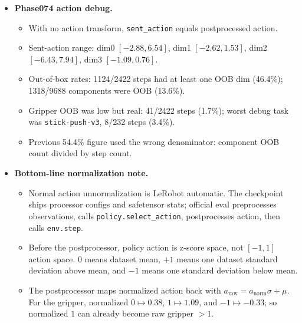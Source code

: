 \documentclass{article}
\begin{document}
\begin{itemize}
  \begin{itemize}
    \item Evidence indicates the dataset stores raw expert XYZ commands before Meta-World internal XYZ clipping.
    \item This is a strong inference, not an author-confirmed fact: no official dataset generation script or maintainer answer was found.
    \item Same ambiguity is publicly raised in the HF dataset discussion and LeRobot issue tracker.\footnote{\url{https://huggingface.co/datasets/lerobot/metaworld_mt50/discussions/5}}\footnote{\url{https://github.com/huggingface/lerobot/issues/2617}}
  \end{itemize}
  \item \textbf{Phase074 action debug.}
  \begin{itemize}
    \item With no action transform, \texttt{sent\_action} equals postprocessed action.
    \item Sent-action range: dim0 \([-2.88,6.54]\), dim1 \([-2.62,1.53]\), dim2 \([-6.43,7.94]\), dim3 \([-1.09,0.76]\).
    \item Out-of-box rates: 1124/2422 steps had at least one OOB dim (46.4\%); 1318/9688 components were OOB (13.6\%).
    \item Gripper OOB was low but real: 41/2422 steps (1.7\%); worst debug task was \texttt{stick-push-v3}, 8/232 steps (3.4\%).
    \item Previous 54.4\% figure used the wrong denominator: component OOB count divided by step count.
  \end{itemize}
  \item \textbf{Bottom-line normalization note.}
  \begin{itemize}
    \item Normal action unnormalization is LeRobot automatic.  The checkpoint ships processor configs and safetensor stats; official eval preprocesses observations, calls \texttt{policy.select\_action}, postprocesses action, then calls \texttt{env.step}.
    \item Before the postprocessor, policy action is z-score space, not \([-1,1]\) action space.  \(0\) means dataset mean, \(+1\) means one dataset standard deviation above mean, and \(-1\) means one standard deviation below mean.
    \item The postprocessor maps normalized action back with \(a_{\mathrm{raw}} = a_{\mathrm{norm}}\sigma+\mu\).  For the gripper, normalized \(0 \mapsto 0.38\), \(1 \mapsto 1.09\), and \(-1 \mapsto -0.33\); so normalized \(1\) can already become raw gripper \(>1\).

\end{itemize}
\end{itemize}
\end{document}
